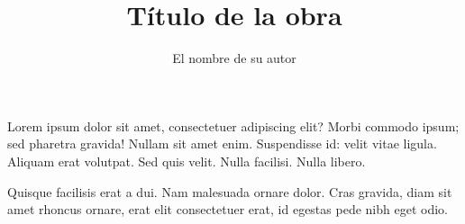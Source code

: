 \documentclass[12pt,a4paper]{book}
\begin{document}
\title{Título de la obra}
\author{El nombre de su autor}

\maketitle

Lorem ipsum dolor sit amet, consectetuer adipiscing elit?
Morbi commodo ipsum; sed pharetra gravida!
Nullam sit amet enim. Suspendisse id: velit vitae ligula.
Aliquam erat volutpat.
Sed quis velit. Nulla facilisi. Nulla libero. 

Quisque facilisis erat a dui.
Nam malesuada ornare dolor.
Cras gravida, diam sit amet rhoncus ornare, 
erat   elit consectetuer erat, id egestas pede nibh eget odio.
\end{document}
